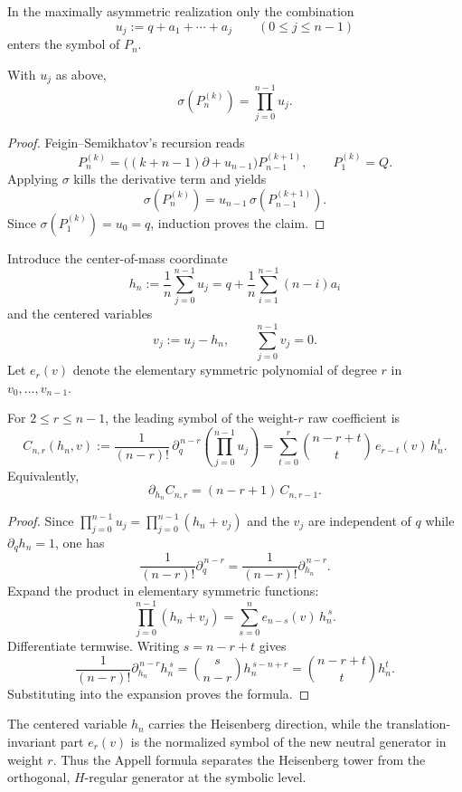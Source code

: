 In the maximally asymmetric realization only the combination
\[
u_j:=q+a_1+\cdots+a_j
\qquad (0\leq j\leq n-1)
\]
enters the symbol of $P_n$.

\begin{theorem}
\label{thm:miura-product-formula}
With $u_j$ as above,
\[
\sigma\!\left(P_n^{(k)}\right)=\prod_{j=0}^{n-1}u_j.
\]
\end{theorem}

\begin{proof}
Feigin--Semikhatov's recursion reads
\[
P_n^{(k)}=\bigl((k+n-1)\partial + u_{n-1}\bigr)P_{n-1}^{(k+1)},
\qquad
P_1^{(k)}=Q.
\]
Applying $\sigma$ kills the derivative term and yields
\[
\sigma(P_n^{(k)})=u_{n-1}\,\sigma(P_{n-1}^{(k+1)}).
\]
Since $\sigma(P_1^{(k)})=u_0=q$, induction proves the claim.
\end{proof}

Introduce the center-of-mass coordinate
\[
h_n:=\frac{1}{n}\sum_{j=0}^{n-1}u_j
=
q+\frac{1}{n}\sum_{i=1}^{n-1}(n-i)a_i
\]
and the centered variables
\[
v_j:=u_j-h_n,
\qquad
\sum_{j=0}^{n-1}v_j=0.
\]
Let $e_r(v)$ denote the elementary symmetric polynomial of degree $r$ in
$v_0,\dots,v_{n-1}$.

\begin{theorem}
\label{thm:subregular-appell-formula}
For $2\leq r\leq n-1$, the leading symbol of the weight-$r$ raw coefficient is
\[
C_{n,r}(h_n,v)
:=
\frac{1}{(n-r)!}\,\partial_q^{\,n-r}\!\left(\prod_{j=0}^{n-1}u_j\right)
=
\sum_{t=0}^{r}\binom{n-r+t}{t}\,e_{r-t}(v)\,h_n^t.
\]
Equivalently,
\[
\partial_{h_n}C_{n,r}=(n-r+1)\,C_{n,r-1}.
\]
\end{theorem}

\begin{proof}
Since $\prod_{j=0}^{n-1}u_j=\prod_{j=0}^{n-1}(h_n+v_j)$ and the $v_j$ are
independent of $q$ while $\partial_q h_n=1$, one has
\[
\frac{1}{(n-r)!}\partial_q^{\,n-r}
=
\frac{1}{(n-r)!}\partial_{h_n}^{\,n-r}.
\]
Expand the product in elementary symmetric functions:
\[
\prod_{j=0}^{n-1}(h_n+v_j)=\sum_{s=0}^{n}e_{n-s}(v)\,h_n^{\,s}.
\]
Differentiate termwise. Writing $s=n-r+t$ gives
\[
\frac{1}{(n-r)!}\partial_{h_n}^{\,n-r}h_n^{\,s}
=
\binom{s}{n-r}h_n^{\,s-n+r}
=
\binom{n-r+t}{t}h_n^t.
\]
Substituting into the expansion proves the formula.
\end{proof}

\begin{remark}
The centered variable $h_n$ carries the Heisenberg direction, while the
translation-invariant part $e_r(v)$ is the normalized symbol of the new neutral
generator in weight $r$. Thus the Appell formula separates the Heisenberg
tower from the orthogonal, $H$-regular generator at the symbolic level.
\end{remark}

